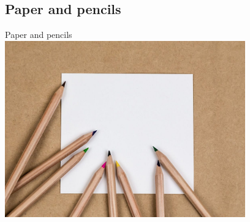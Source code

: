 \documentclass{beamer}
\begin{document}
\subsection{Paper and pencils}
\begin{frame}[fragile]{Paper and pencils}
\includegraphics[height=3in]{Paperandpencils.jpg}
\end{frame}
\end{document}
